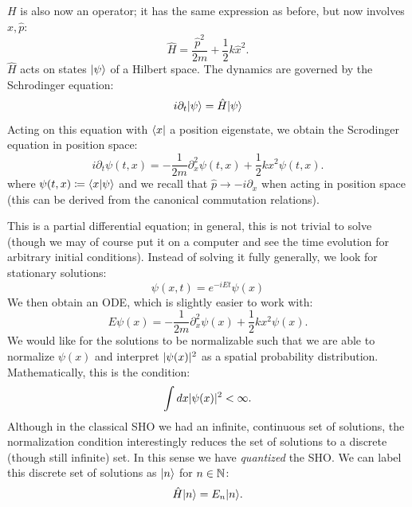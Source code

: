 $H$ is also now an operator; it has the same expression as before, but now involves $\hat{x}, \hat{p}$:
\begin{equation}
    \hat{H} = \frac{\hat{p}^2}{2m} + \frac{1}{2}k\hat{x}^2.
\end{equation}
$\hat{H}$ acts on states $\lvert \psi \rangle$ of a Hilbert space. The dynamics are governed by the Schrodinger equation:
\begin{equation}
    i\partial_t \lvert \psi \rangle = \hat{H}\lvert \psi \rangle
\end{equation}
Acting on this equation with $\langle x \rvert$ a position eigenstate, we obtain the Scrodinger equation in position space:
\begin{equation}
    i\partial_t \psi(t, x) = -\frac{1}{2m}\partial_x^2\psi(t, x) + \frac{1}{2}kx^2\psi(t, x).
\end{equation}
where $\psi(t, x) \coloneqq \langle x \lvert \psi \rangle$ and we recall that $\hat{p} \to -i\partial_x$ when acting in position space (this can be derived from the canonical commutation relations).

This is a partial differential equation; in general, this is not trivial to solve (though we may of course put it on a computer and see the time evolution for arbitrary initial conditions). Instead of solving it fully generally, we look for stationary solutions:
\begin{equation}
    \psi(x, t) = e^{-iEt}\psi(x)
\end{equation}
We then obtain an ODE, which is slightly easier to work with:
\begin{equation}
    E\psi(x) = -\frac{1}{2m}\partial_x^2\psi(x) + \frac{1}{2}kx^2\psi(x).
\end{equation}
We would like for the solutions to be normalizable such that we are able to normalize $\psi(x)$ and interpret $\lvert \psi(x) \rvert^2$ as a spatial probability distribution. Mathematically, this is the condition:
\begin{equation}
    \int dx \lvert \psi(x) \rvert^2 < \infty.
\end{equation}
Although in the classical SHO we had an infinite, continuous set of solutions, the normalization condition interestingly reduces the set of solutions to a discrete (though still infinite) set. In this sense we have \emph{quantized} the SHO. We can label this discrete set of solutions as $\lvert n \rangle$ for $n \in \mathbb{N}$:
\begin{equation}
    \hat{H}\lvert n \rangle = E_n\lvert n \rangle.
\end{equation}

